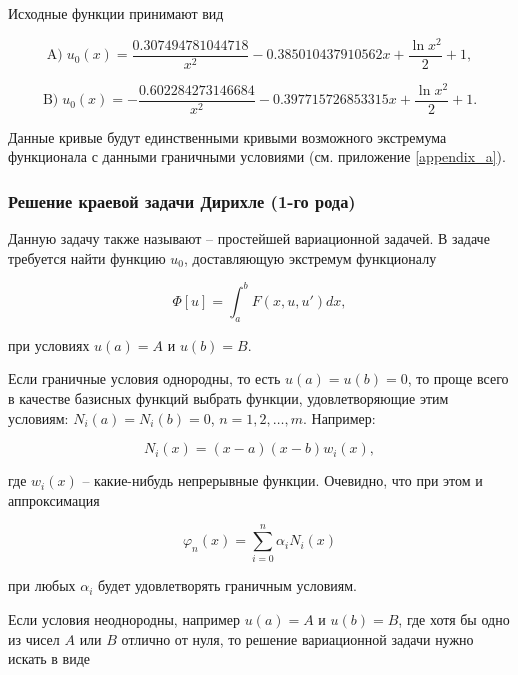 \documentclass{article}
\begin{document}
\noindent Исходные функции принимают вид

\begin{displaymath}
	\text{A)} \; u_{0}(x) = \frac{0.307494781044718}{x^2} - 0.385010437910562 x + \frac{\ln{x^2}}{2} + 1,
\end{displaymath}

\begin{displaymath}
	\text{B)} \; u_{0}(x) = - \frac{0.602284273146684}{x^2} - 0.397715726853315 x + \frac{\ln{x^2}}{2} + 1.
\end{displaymath}

Данные кривые будут единственными кривыми возможного экстремума функционала с данными граничными условиями (см. приложение \ref{appendix_a}). 

\subsubsection{Решение краевой задачи Дирихле (1-го рода)}

Данную задачу также называют – простейшей вариационной задачей. В задаче требуется найти функцию $u_{0}$, доставляющую экстремум функционалу

\begin{displaymath}
	\Phi[u] = \int_{a}^{b} F(x, u, u')dx,
\end{displaymath}

\noindent при условиях $u(a) = A$ и $u(b) = B$.

Если граничные условия однородны, то есть $u(a) = u(b) = 0$, то проще всего в качестве базисных функций выбрать функции, удовлетворяющие этим условиям: $N_{i}(a) = N_{i}(b) = 0$, $n = 1, 2, \ldots, m$. Например:

\begin{displaymath}
	N_{i}(x) = (x-a)(x-b)w_{i}(x),
\end{displaymath}

\noindent где $w_{i}(x)$ – какие-нибудь непрерывные функции. Очевидно, что при этом и аппроксимация 

\begin{displaymath}
	\varphi_{n}(x) = \sum_{i=0}^n \alpha_{i}N_{i}(x)
\end{displaymath}

\noindent при любых $\alpha_{i}$ будет удовлетворять граничным условиям.

Если условия неоднородны, например $u(a) = A$ и $u(b) = B$, где хотя бы одно из чисел $A$ или $B$ отлично от нуля, то решение вариационной задачи нужно искать в виде
\end{document}
